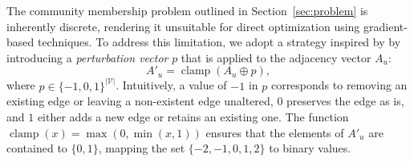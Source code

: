 



The community membership problem outlined in Section~\ref{sec:problem} is inherently discrete, rendering it unsuitable for direct optimization using gradient-based techniques.
To address this limitation, we adopt a strategy inspired by \citet{trappolini2023savage} by introducing a \textit{perturbation vector} $p$ that is applied to the adjacency vector $A_u$: 
\begin{equation}
    A'_u = \operatorname{clamp}(A_u \oplus p),
\end{equation}
where $p \in \{-1,0,1\}^{|\mathcal{V}|}$. Intuitively, a value of $-1$ in $p$ corresponds to removing an existing edge or leaving a non-existent edge unaltered, $0$ preserves the edge as is, and $1$ either adds a new edge or retains an existing one. The function $\operatorname{clamp}(x) = \max (0, \min (x,1))$ ensures that the elements of $A'_u$ are contained to $\{0,1\}$, mapping the set $\{-2,-1,0,1,2\}$ to binary values.

